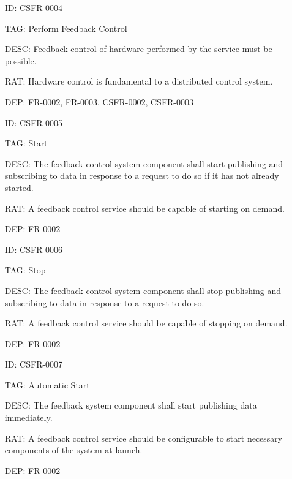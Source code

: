         \begin{itemize}
          \setlength{\itemindent}{.5in}
          \itemsep .15em
          \item[ID:] CSFR-0004
          \item[TAG:] Perform Feedback Control
          \item[DESC:] Feedback control of hardware performed by the service
            must be possible.
          \item[RAT:] Hardware control is fundamental to a distributed
            control system.
          \item[DEP:] FR-0002, FR-0003, CSFR-0002, CSFR-0003
        \end{itemize}

        \begin{itemize}
          \setlength{\itemindent}{.5in}
          \itemsep .15em
          \item[ID:] CSFR-0005
          \item[TAG:] Start
          \item[DESC:] The feedback control system component shall start
            publishing and subscribing to data in response to a request to do
            so if it has not already started.
          \item[RAT:] A feedback control service should be capable of starting
            on demand.
          \item[DEP:] FR-0002
        \end{itemize}

        \begin{itemize}
          \setlength{\itemindent}{.5in}
          \itemsep .15em
          \item[ID:] CSFR-0006
          \item[TAG:] Stop
          \item[DESC:] The feedback control system component shall stop
            publishing and subscribing to data in response to a request to do
            so.
          \item[RAT:] A feedback control service should be capable of stopping
            on demand.
          \item[DEP:] FR-0002
        \end{itemize}

        \begin{itemize}
          \setlength{\itemindent}{.5in}
          \itemsep .15em
          \item[ID:] CSFR-0007
          \item[TAG:] Automatic Start
          \item[DESC:] The feedback system component shall start
            publishing data immediately.
          \item[RAT:] A feedback control service should be configurable to start
            necessary components of the system at launch.
          \item[DEP:] FR-0002
        \end{itemize}

